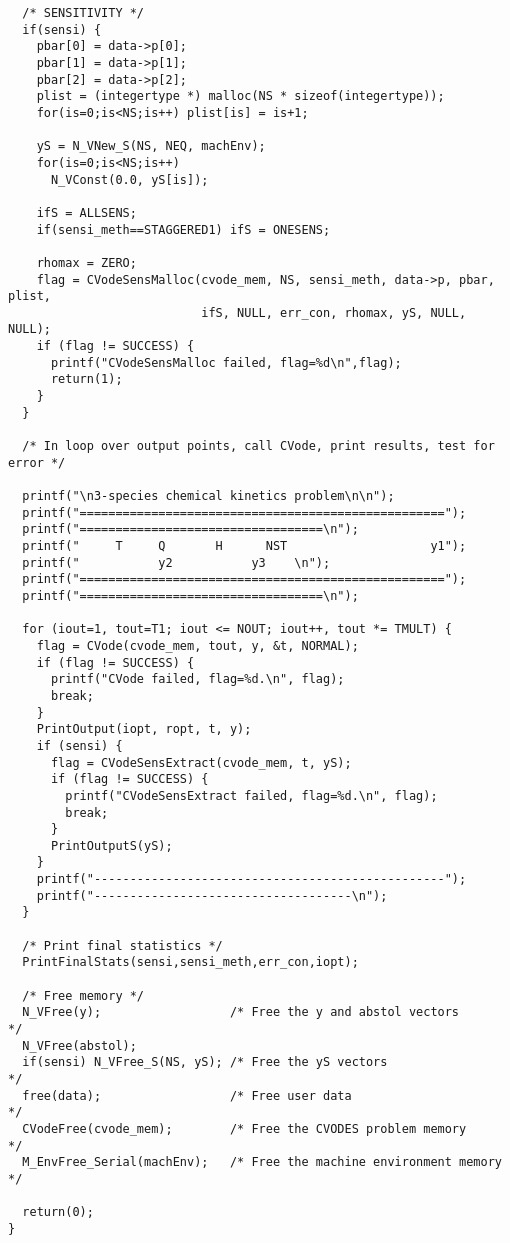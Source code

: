 \begin{verbatim}
  /* SENSITIVITY */
  if(sensi) {
    pbar[0] = data->p[0];
    pbar[1] = data->p[1];
    pbar[2] = data->p[2];
    plist = (integertype *) malloc(NS * sizeof(integertype));
    for(is=0;is<NS;is++) plist[is] = is+1;

    yS = N_VNew_S(NS, NEQ, machEnv);
    for(is=0;is<NS;is++)
      N_VConst(0.0, yS[is]);

    ifS = ALLSENS;
    if(sensi_meth==STAGGERED1) ifS = ONESENS;

    rhomax = ZERO;
    flag = CVodeSensMalloc(cvode_mem, NS, sensi_meth, data->p, pbar, plist,
                           ifS, NULL, err_con, rhomax, yS, NULL, NULL);
    if (flag != SUCCESS) {
      printf("CVodeSensMalloc failed, flag=%d\n",flag);
      return(1);
    }
  }
  
  /* In loop over output points, call CVode, print results, test for error */

  printf("\n3-species chemical kinetics problem\n\n");
  printf("===================================================");
  printf("==================================\n");
  printf("     T     Q       H      NST                    y1");
  printf("           y2           y3    \n");
  printf("===================================================");
  printf("==================================\n");

  for (iout=1, tout=T1; iout <= NOUT; iout++, tout *= TMULT) {
    flag = CVode(cvode_mem, tout, y, &t, NORMAL);
    if (flag != SUCCESS) {
      printf("CVode failed, flag=%d.\n", flag); 
      break; 
    }
    PrintOutput(iopt, ropt, t, y);
    if (sensi) {
      flag = CVodeSensExtract(cvode_mem, t, yS);
      if (flag != SUCCESS) { 
        printf("CVodeSensExtract failed, flag=%d.\n", flag); 
        break; 
      }
      PrintOutputS(yS);
    } 
    printf("-------------------------------------------------");
    printf("------------------------------------\n");
  }

  /* Print final statistics */
  PrintFinalStats(sensi,sensi_meth,err_con,iopt);

  /* Free memory */
  N_VFree(y);                  /* Free the y and abstol vectors       */
  N_VFree(abstol);   
  if(sensi) N_VFree_S(NS, yS); /* Free the yS vectors                 */
  free(data);                  /* Free user data                      */
  CVodeFree(cvode_mem);        /* Free the CVODES problem memory      */
  M_EnvFree_Serial(machEnv);   /* Free the machine environment memory */

  return(0);
}



\end{verbatim}
